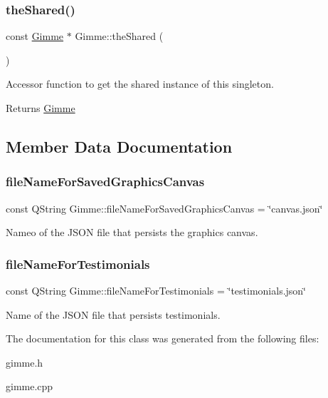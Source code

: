 \subsubsection{\texorpdfstring{theShared()}{theShared()}}
{\footnotesize\ttfamily const \mbox{\hyperlink{class_gimme}{Gimme}} $\ast$ Gimme\+::the\+Shared (\begin{DoxyParamCaption}{ }\end{DoxyParamCaption})\hspace{0.3cm}{\ttfamily [static]}}



Accessor function to get the shared instance of this singleton. 

\begin{DoxyReturn}{Returns}
\mbox{\hyperlink{class_gimme}{Gimme}} 
\end{DoxyReturn}


\subsection{Member Data Documentation}
\mbox{\label{class_gimme_a75f442cedd5b873cc9982a812ac56c8f}} 
\subsubsection{\texorpdfstring{fileNameForSavedGraphicsCanvas}{fileNameForSavedGraphicsCanvas}}
{\footnotesize\ttfamily const Q\+String Gimme\+::file\+Name\+For\+Saved\+Graphics\+Canvas = \char`\"{}canvas.\+json\char`\"{}}

Nameo of the J\+S\+ON file that persists the graphics canvas. \mbox{\label{class_gimme_aa9fd95a9aa3dc9734d4f8357c4620efa}} 
\subsubsection{\texorpdfstring{fileNameForTestimonials}{fileNameForTestimonials}}
{\footnotesize\ttfamily const Q\+String Gimme\+::file\+Name\+For\+Testimonials = \char`\"{}testimonials.\+json\char`\"{}}

Name of the J\+S\+ON file that persists testimonials. 

The documentation for this class was generated from the following files\+:\begin{DoxyCompactItemize}
\item 
gimme.\+h\item 
gimme.\+cpp\end{DoxyCompactItemize}
